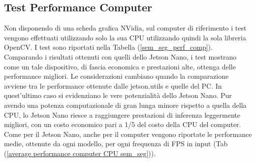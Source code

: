 \newpage
\subsection{Test Performance Computer}
Non disponendo di una scheda grafica NVidia, sul computer di riferimento i 
test vengono effettuati utilizzando solo la sua CPU utilizzando quindi la sola 
libreria OpenCV. I test sono riportati nella Tabella (\ref{sem_seg_perf_comp}). Comparando 
i risultati ottenuti con quelli dello Jetson Nano, i test mostrano come 
un tale dispositivo, di fascia economica e prestazioni alte, ottenga delle 
performance migliori. Le considerazioni cambiano quando la comparazione 
avviene tra le performance ottenute dalle jetson.utils e quelle del PC. In 
quest'ultimo caso si evidenziano le vere potenzialità dello Jetson Nano. Pur 
avendo una potenza computazionale di gran lunga minore rispetto a quella 
della CPU, lo Jetson Nano riesce a raggiungere prestazioni di inferenza 
leggermente migliori, con un costo economico pari a 1/5 del costo della CPU 
del computer. Come per il Jetson Nano, anche per il computer vengono 
riportate le performance medie, ottenute da ogni modello, per ogni frequenza 
di FPS in input (Tab (\ref{average performance computer CPU sem_seg})).


